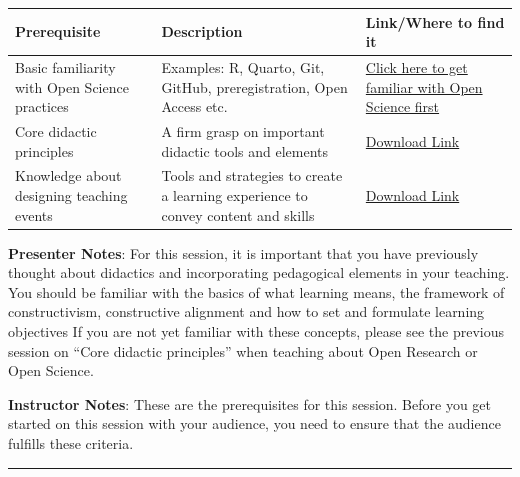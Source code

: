 \documentclass[
  letterpaper,
  DIV=11,
  numbers=noendperiod]{scrartcl}
\newcounter{none} %
\begin{document}
{\def\LTcaptype{none} %
\begin{longtable}[]{@{}
  >{\raggedright\arraybackslash}p{}
  >{\raggedright\arraybackslash}p{}
  >{\raggedright\arraybackslash}p{}@{}}
\toprule\noalign{}
\begin{minipage}[b]{\linewidth}\raggedright
Prerequisite
\end{minipage} & \begin{minipage}[b]{\linewidth}\raggedright
Description
\end{minipage} & \begin{minipage}[b]{\linewidth}\raggedright
Link/Where to find it
\end{minipage} \\
\midrule\noalign{}
\endhead
\bottomrule\noalign{}
\endlastfoot
Basic familiarity with Open Science practices & Examples: R, Quarto,
Git, GitHub, preregistration, Open Access etc. &
\href{https://lmu-osc.github.io/train-the-trainer-student-track-OS/}{Click
here to get familiar with Open Science first} \\
Core didactic principles & A firm grasp on important didactic tools and
elements & \href{https://quarto.org}{Download Link} \\
Knowledge about designing teaching events & Tools and strategies to
create a learning experience to convey content and skills &
\href{https://quarto.org}{Download Link} \\
\end{longtable}
}

\textbf{Presenter Notes}: For this session, it is important that you
have previously thought about didactics and incorporating pedagogical
elements in your teaching. You should be familiar with the basics of
what learning means, the framework of constructivism, constructive
alignment and how to set and formulate learning objectives If you are
not yet familiar with these concepts, please see the previous session on
``Core didactic principles'' when teaching about Open Research or Open
Science.

\textbf{Instructor Notes}: These are the prerequisites for this session.
Before you get started on this session with your audience, you need to
ensure that the audience fulfills these criteria.

\begin{center}\rule{0.5\linewidth}{0.5pt}\end{center}
\end{document}

